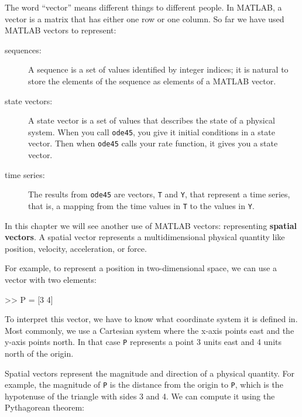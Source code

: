 \documentclass[
]{book}
\numberwithin{Answer}{chapter}
\numberwithin{Exercise}{chapter}
\begin{document}
The word ``vector'' means different
things to different people.  In MATLAB, a vector is a matrix that has
either one row or one column.  So far we have used MATLAB vectors to
represent:

\begin{description}

\item[sequences:] A sequence is a set of values identified by
integer indices; it is natural to store the elements of the
sequence as elements of a MATLAB vector.

\item[state vectors:] A state vector is a set of values that
describes the state of a physical system.  When you call
{\tt ode45}, you give it initial conditions in a state
vector.  Then when {\tt ode45} calls your rate function, it
gives you a state vector.

\item[time series:] The results from {\tt ode45} are vectors, {\tt T} and {\tt Y}, that represent a time series, that is, a mapping from the time values in {\tt T} to the values in {\tt Y}.

\end{description}


In this chapter we will see another use of MATLAB vectors: representing
{\bf spatial vectors}.  A spatial vector represents a multidimensional physical quantity like position, velocity, acceleration, or force.


For example, to represent a position in two-dimensional space, we can use a vector with two elements:

\begin{code}
>> P = [3 4]
\end{code}

To interpret this vector, we have to know what coordinate system it is defined in.  Most commonly, we use a Cartesian system where the x-axis points east and the y-axis points north.  In that case {\tt P} represents a point 3 units east and 4 units north of the origin.


Spatial vectors represent the magnitude and direction of a physical quantity.  For example, the magnitude of {\tt P} is the distance from the origin to {\tt P}, which is the hypotenuse of the triangle with sides 3 and 4.  We can compute it using the Pythagorean theorem:
\end{document}
